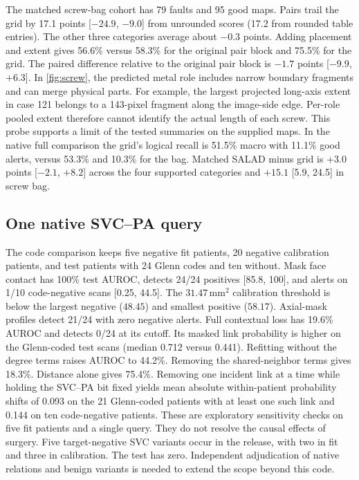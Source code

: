 The matched screw-bag cohort has 79 faults and 95 good maps. Pairs trail the grid by 17.1 points [$-24.9$, $-9.0$] from unrounded scores (17.2 from rounded table entries). The other three categories average about $-0.3$ points. Adding placement and extent gives 56.6\% versus 58.3\% for the original pair block and 75.5\% for the grid. The paired difference relative to the original pair block is $-1.7$ points [$-9.9$, $+6.3$]. In \cref{fig:screw}, the predicted metal role includes narrow boundary fragments and can merge physical parts. For example, the largest projected long-axis extent in case 121 belongs to a 143-pixel fragment along the image-side edge. Per-role pooled extent therefore cannot identify the actual length of each screw. This probe supports a limit of the tested summaries on the supplied maps. In the native full comparison the grid's logical recall is 51.5\% macro with 11.1\% good alerts, versus 53.3\% and 10.3\% for the bag. Matched SALAD minus grid is $+3.0$ points [$-2.1$, $+8.2$] across the four supported categories and $+15.1$ [5.9, 24.5] in screw bag.

\subsection{One native SVC--PA query}
The code comparison keeps five negative fit patients, 20 negative calibration patients, and test patients with 24 Glenn codes and ten without. Mask face contact has 100\% test AUROC, detects 24/24 positives [85.8, 100], and alerts on 1/10 code-negative scans [0.25, 44.5]. The $31.47\,\mathrm{mm}^2$ calibration threshold is below the largest negative ($48.45$) and smallest positive ($58.17$). Axial-mask profiles detect 21/24 with zero negative alerts. Full contextual loss has 19.6\% AUROC and detects 0/24 at its cutoff. Its masked link probability is higher on the Glenn-coded test scans (median 0.712 versus 0.441). Refitting without the degree terms raises AUROC to 44.2\%. Removing the shared-neighbor terms gives 18.3\%. Distance alone gives 75.4\%. Removing one incident link at a time while holding the SVC--PA bit fixed yields mean absolute within-patient probability shifts of 0.093 on the 21 Glenn-coded patients with at least one such link and 0.144 on ten code-negative patients. These are exploratory sensitivity checks on five fit patients and a single query. They do not resolve the causal effects of surgery. Five target-negative SVC variants occur in the release, with two in fit and three in calibration. The test has zero. Independent adjudication of native relations and benign variants is needed to extend the scope beyond this code.

